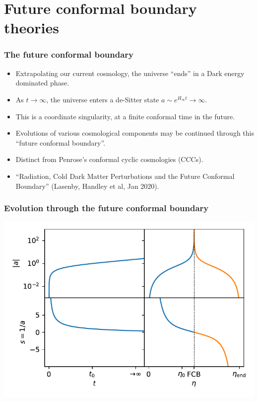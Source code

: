 \documentclass[%
]{beamer}
\begin{document}
\section{Future conformal boundary theories}

\begin{frame}
    \frametitle{The future conformal boundary}

    \begin{itemize}
        \item Extrapolating our current cosmology, the universe ``ends'' in a Dark energy dominated phase.
        \item As $t\to\infty$, the universe enters a de-Sitter state $a\sim e^{H_\infty t}\to\infty$.
        \item This is a coordinate singularity, at a finite conformal time in the future.
        \item Evolutions of various cosmological components may be continued through this ``future conformal boundary''.
        \item Distinct from Penrose's conformal cyclic cosmologies (CCCs).
        \item ``Radiation, Cold Dark Matter Perturbations and the Future Conformal Boundary'' (Lasenby, Handley et al, Jan 2020).
    \end{itemize}
\end{frame}

\begin{frame}
    \frametitle{Evolution through the future conformal boundary}
    \includegraphics[width=\textwidth]{evolution}
\end{frame}
\end{document}
